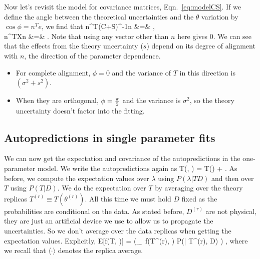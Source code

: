 Now let's revisit the model for covariance matrices, Eqn.~\ref{eq:modelCS}. If we define the angle between the theoretical uncertainties and the $\theta$ variation by $\cos \phi = n^T e$, we find that
\bea
\label{eq:denom}
n^T(C+S)^{-1}n &=& ,\\
n^TXn &=& .
\eea
Note that using any vector other than $n$ here gives 0. We can see that the effects from the theory uncertainty ($s$) depend on its degree of alignment with $n$, the direction of the parameter dependence. 
\begin{itemize}
\item For complete alignment, $\phi=0$ and the variance of $T$ in this direction is $(\sigma^2 + s^2)$.
\item When they are orthogonal, $\phi= \hbox{${{\pi}\over {2}}$}$ and the variance is $\sigma^2$, so the theory uncertainty doesn't factor into the fitting.
\end{itemize}

\subsection{Autopredictions in single parameter fits}
We can now get the expectation and covariance of the autopredictions in the one-parameter model. We write the autopredictions again as
\be 
T(\theta, \lambda) = T(\theta) + \lambda \beta.
\ee
As before, we compute the expectation values over $\lambda$ using $P(\lambda |TD)$ and then over $T$ using $P(T|D)$. We do the expectation over $T$ by averaging over the theory replicas $T^{(r)} \equiv T(\theta^{(r)})$. All this time we must hold $D$ fixed as the probabilities are conditional on the data. As stated before, $D^{(r)}$ are not physical, they are just an artificial device we use to allow us to propagate the uncertainties. So we don't average over the data replicas when getting the expectation values. Explicitly, 
\be 
E[f(T, \lambda)] = \langle (_\lambda \int \d \lambda \ f(T^{(r)}, \lambda) P(\lambda | T^{(r)}, D) ) \rangle,
\ee
where we recall that $\langle \cdot \rangle$ denotes the replica average.


